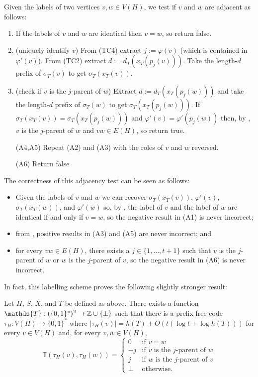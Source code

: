\documentclass[kpfonts]{patmorin}
\begin{document}
Given the labels of two vertices $v,w\in V(H)$, we test if $v$ and $w$ are adjacent as follows:
\begin{enumerate}[({A}1)]
  \item If the labels of $v$ and $w$ are identical then $v=w$, so return false.
  
  \item (uniquely identify $v$) From (TC4) extract $j:=\varphi(v)$ (which is contained in $\varphi'(v)$).  From (TC2) extract $d:=d_T(x_T(p_j(v)))$. Take the length-$d$ prefix of $\sigma_T(v)$ to get $\sigma_T(x_T(v))$.

  \item (check if $v$ is the $j$-parent of $w$) Extract $d:=d_T(x_T(p_j(w)))$ and take the length-$d$ prefix of $\sigma_T(w)$ to get $\sigma_T(x_T(p_j(w)))$.  If $\sigma_T(x_T(v))=\sigma_T(x_T(p_j(w)))$ and $\varphi'(v)=\varphi'(p_j(w))$ then, by , $v$ is the $j$-parent of $w$ and $vw\in E(H)$, so return true.
  
  \item[(A4,A5)] Repeat (A2) and (A3) with the roles of $v$ and $w$ reversed.
  
  \item[(A6)] Return false
\end{enumerate}

The correctness of this adjacency test can be seen as follows:
\begin{itemize}
  \item Given the labels of $v$ and $w$ we can recover $\sigma_T(x_T(v))$, $\varphi'(v)$, $\sigma_T(x_T(w))$, and $\varphi'(w)$ so, by , the label of $v$ and the label of $w$ are identical if and only if $v=w$, so the negative result in (A1) is never incorrect;
  \item from , positive results in (A3) and (A5) are never incorrect; and 
  \item for every $vw\in E(H)$, there exists a $j\in\{1,\ldots,t+1\}$ such that $v$ is the $j$-parent of $w$ or $w$ is the $j$-parent of $v$, so the negative result in (A6) is never incorrect.    
\end{itemize}
In fact, this labelling scheme proves the following slightly stronger result:

\begin{lem}
  Let $H$, $S$, $X$, and $T$ be defined as above.  There exists a function $\mathds{T}:(\{0,1\}^*)^2\to \Z\cup\{\perp\}$ such that there is a prefix-free code $\tau_H:V(H)\to\{0,1\}^*$ where $|\tau_H(v)|=h(T) + O(t(\log t + \log h(T)))$ for every $v\in V(H)$ and, for every $v,w\in V(H)$, 
  \[
      \mathds{T}(\tau_H(v),\tau_H(w)) = \begin{cases}
      0 & \text{if $v=w$} \\
      -j & \text{if $v$ is the $j$-parent of $w$} \\
      j & \text{if $w$ is the $j$-parent of $v$} \\
      \perp & \text{otherwise.}
    \end{cases}
  \]
\end{lem}
\end{document}
